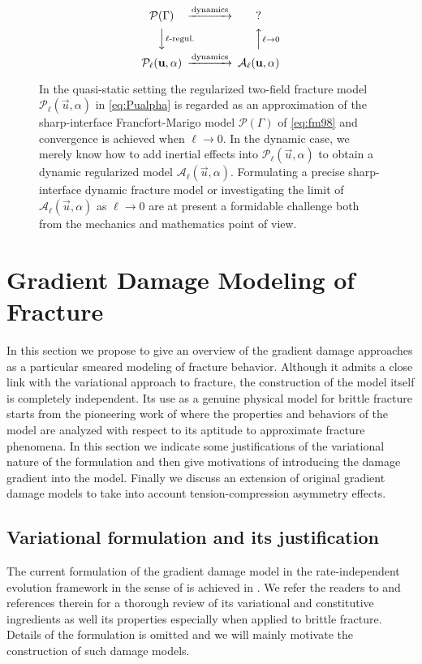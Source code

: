\begin{figure}[htbp]
\centering
\[
\begin{CD}
\mathcal{P}(\Gamma) @>\text{dynamics}>> \text{?} \\
@VV\text{$\ell$-regul.}V @AA{\ell\to 0}A \\
\mathcal{P}_\ell(\vec{u},\alpha) @>\text{dynamics}>> \mathcal{A}_\ell(\vec{u},\alpha)
\end{CD}
\]
\caption{In the quasi-static setting the regularized two-field fracture model $\mathcal{P}_\ell(\vec{u},\alpha)$ in \eqref{eq:Pualpha} is regarded as an approximation of the sharp-interface Francfort-Marigo model $\mathcal{P}(\Gamma)$ of \eqref{eq:fm98} and convergence is achieved when $\ell\to 0$. In the dynamic case, we merely know how to add inertial effects into $\mathcal{P}_\ell(\vec{u},\alpha)$ to obtain a dynamic regularized model $\mathcal{A}_\ell(\vec{u},\alpha)$. Formulating a precise sharp-interface dynamic fracture model or investigating the limit of $\mathcal{A}_\ell(\vec{u},\alpha)$ as $\ell\to 0$ are at present a formidable challenge both from the mechanics and mathematics point of view.} \label{fig:fourmodels}
\end{figure}

\section{Gradient Damage Modeling of Fracture} \label{sec:graddamage}
In this section we propose to give an overview of the gradient damage approaches as a particular smeared modeling of fracture behavior. Although it admits a close link with the variational approach to fracture, the construction of the model itself is completely independent. Its use as a genuine physical model for brittle fracture starts from the pioneering work of \cite{PhamAmorMarigoMaurini:2011} where the properties and behaviors of the model are analyzed with respect to its aptitude to approximate fracture phenomena. In this section we indicate some justifications of the variational nature of the formulation and then give motivations of introducing the damage gradient into the model. Finally we discuss an extension of original gradient damage models to take into account tension-compression asymmetry effects.

\subsection{Variational formulation and its justification} \label{sec:improved}
The current formulation of the gradient damage model in the rate-independent evolution framework in the sense of \cite{Mielke:2005} is achieved in \cite{PhamMarigo:2010,PhamMarigo:2010-1}. We refer the readers to \cite{PhamAmorMarigoMaurini:2011} and references therein for a thorough review of its variational and constitutive ingredients as well its properties especially when applied to brittle fracture. Details of the formulation is omitted and we will mainly motivate the construction of such damage models.

